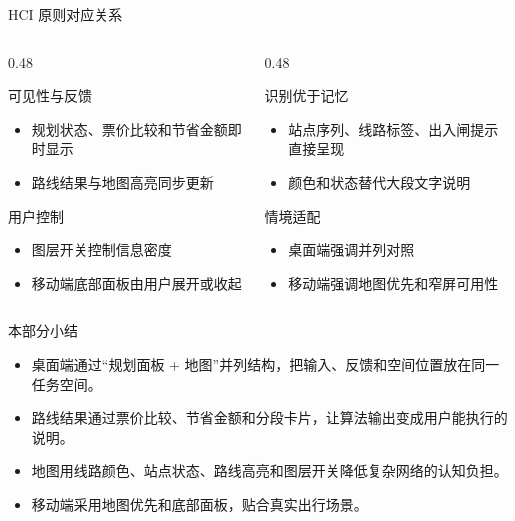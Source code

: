 \documentclass[aspectratio=169]{beamer}
\begin{document}
\begin{frame}{HCI 原则对应关系}
  \begin{columns}[T,onlytextwidth]
    \begin{column}{0.48\textwidth}
      \begin{block}{可见性与反馈}
        \begin{itemize}
          \item 规划状态、票价比较和节省金额即时显示
          \item 路线结果与地图高亮同步更新
        \end{itemize}
      \end{block}
      \begin{block}{用户控制}
        \begin{itemize}
          \item 图层开关控制信息密度
          \item 移动端底部面板由用户展开或收起
        \end{itemize}
      \end{block}
    \end{column}
    \begin{column}{0.48\textwidth}
      \begin{block}{识别优于记忆}
        \begin{itemize}
          \item 站点序列、线路标签、出入闸提示直接呈现
          \item 颜色和状态替代大段文字说明
        \end{itemize}
      \end{block}
      \begin{block}{情境适配}
        \begin{itemize}
          \item 桌面端强调并列对照
          \item 移动端强调地图优先和窄屏可用性
        \end{itemize}
      \end{block}
    \end{column}
  \end{columns}
\end{frame}

\begin{frame}{本部分小结}
  \begin{itemize}
    \item 桌面端通过“规划面板 + 地图”并列结构，把输入、反馈和空间位置放在同一任务空间。
    \item 路线结果通过票价比较、节省金额和分段卡片，让算法输出变成用户能执行的说明。
    \item 地图用线路颜色、站点状态、路线高亮和图层开关降低复杂网络的认知负担。
    \item 移动端采用地图优先和底部面板，贴合真实出行场景。
  \end{itemize}

  \vspace{0.8em}
  \centering
  \color{DeepBlue}{用界面结构降低认知负担，用视觉反馈建立用户信任。}
\end{frame}
\end{document}
